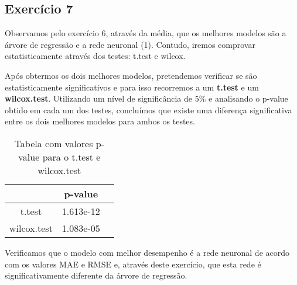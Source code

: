 \subsection{Exercício 7}

Observamos pelo exercício 6, através da média, que os melhores modelos são a árvore de regressão e a rede neuronal (1). Contudo, iremos comprovar estatisticamente através dos testes: t.test e wilcox.

Após obtermos os dois melhores modelos, pretendemos verificar se são estatisticamente significativos e para isso recorremos a um \textbf{t.test} e um \textbf{wilcox.test}. Utilizando um nível de significância de 5\% e analisando o p-value obtido em cada um dos testes, concluímos que existe uma diferença significativa entre os dois melhores modelos para ambos os testes.

\begin{table}[htbp]
	\caption{Tabela com valores p-value para o t.test e wilcox.test}
    \begin{center}
    \begin{tabular}{|c|c|c|}
      \hline
       & \textbf{p-value} \\
      \hline
      t.test & 1.613e-12\\
      \hline
      wilcox.test & 1.083e-05\\
      \hline
    \end{tabular}
    \label{tab_7}
    \end{center}
\end{table}

Verificamos que o modelo com melhor desempenho é a rede neuronal de acordo com os valores MAE e RMSE e, através deste exercício, que esta rede é significativamente diferente da árvore de regressão.

